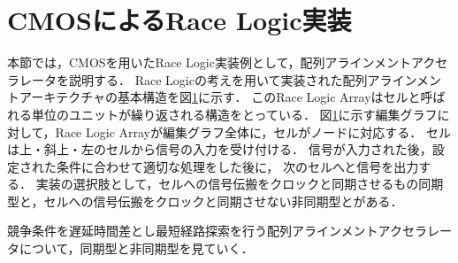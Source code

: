 \section{CMOSによるRace Logic実装}
本節では，CMOSを用いたRace Logic実装例として，配列アラインメントアクセラレータを説明する．
Race Logicの考えを用いて実装された配列アラインメントアーキテクチャの基本構造を図\ref{}に示す．
このRace Logic Arrayはセルと呼ばれる単位のユニットが繰り返される構造をとっている．
図\ref{}に示す編集グラフに対して，Race Logic Arrayが編集グラフ全体に，セルがノードに対応する．
セルは上・斜上・左のセルから信号の入力を受け付ける．
信号が入力された後，設定された条件に合わせて適切な処理をした後に，
次のセルへと信号を出力する．
実装の選択肢として，セルへの信号伝搬をクロックと同期させるもの同期型と，セルへの信号伝搬をクロックと同期させない非同期型とがある．

競争条件を遅延時間差とし最短経路探索を行う配列アラインメントアクセラレータについて，同期型と非同期型を見ていく．

